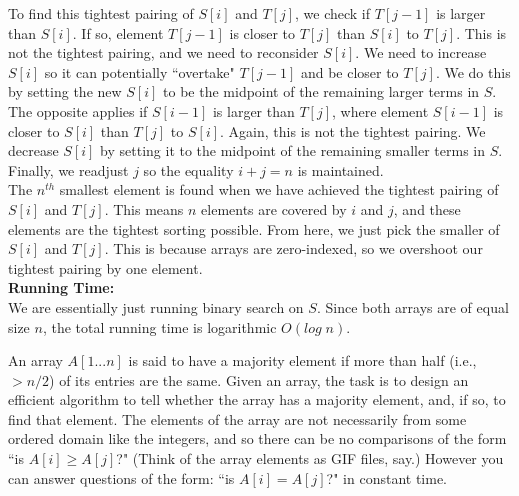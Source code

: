 \documentclass[answers]{exam}
\begin{document}
\begin{questions}
To find this tightest pairing of $S[i]$ and $T[j]$, we check if $T[j - 1]$ is larger than $S[i]$. If so, element $T[j - 1]$ is closer to $T[j]$ than $S[i]$ to $T[j]$. This is not the tightest pairing, and we need to reconsider $S[i]$. We need to increase $S[i]$ so it can potentially ``overtake" $T[j - 1]$ and be closer to $T[j]$. We do this by setting the new $S[i]$ to be the midpoint of the remaining larger terms in $S$. The opposite applies if $S[i - 1]$ is larger than $T[j]$, where element $S[i - 1]$ is closer to $S[i]$ than $T[j]$ to $S[i]$. Again, this is not the tightest pairing. We decrease $S[i]$ by setting it to the midpoint of the remaining smaller terms in $S$. Finally, we readjust $j$ so the equality $i + j = n$ is maintained. \\


The $n^{th}$ smallest element is found when we have achieved the tightest pairing of $S[i]$ and $T[j]$. This means $n$ elements are covered by $i$ and $j$, and these elements are the tightest sorting possible. From here, we just pick the smaller of $S[i]$ and $T[j]$. This is because arrays are zero-indexed, so we overshoot our tightest pairing by one element. \\


{\bf Running Time:}\\
We are essentially just running binary search on $S$. Since both arrays are of equal size $n$, the total running time is logarithmic $O(log\;n)$.


\vspace{0.2in}




\question
An array $A[1...n]$ is said to have a majority element if more than half (i.e., $> n/2$) of its entries are the same. Given an array, the task is to design an efficient algorithm to tell whether the array has a majority element, and, if so, to find that element. The elements of the array are not necessarily from some ordered domain like the integers, and so there can be no comparisons of the form ``is $A[i] \geq A[j]$?" (Think of the array elements as GIF files, say.) However you can answer questions of the form: ``is $A[i] = A[j]$?" in constant time.
\end{questions}
\end{document}
